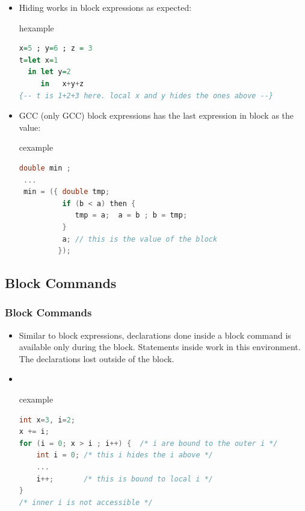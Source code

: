 \begin{frame}[fragile]
\begin{itemize}
 \item Hiding works in block expressions as expected:
\begin{beamercolorbox}{hexample}
\begin{lstlisting}[language={Haskell},escapechar=\#]
x=5 ; y=6 ; z = 3
t=let x=1 
  in let y=2 
     in   x+y+z
{-- t is 1+2+3 here. local x and y hides the ones above --}
\end{lstlisting}
\end{beamercolorbox}
 \item GCC (only GCC) block expressions has the last expression in block as the value:
\begin{beamercolorbox}{cexample}
\begin{lstlisting}[language=C,escapechar=\#]
 double min ;
 ...
 min = ({ double tmp;
          if (b < a) then {
             tmp = a;  a = b ; b = tmp;
          }
          a; // this is the value of the block
         });
\end{lstlisting}\end{beamercolorbox}
\end{itemize}
\end{frame}

\subsection{Block Commands}
\begin{frame}[fragile]
\frametitle{Block Commands}
\begin{itemize}
 \item Similar to block expressions, declarations done inside a block command is available only
 during the block. Statements inside work in this environment. The declarations lost outside of
 the block. 
 \item \ \\
\begin{beamercolorbox}{cexample}
\begin{lstlisting}[language={C},escapechar=\#]
int x=3, i=2;
x += i;
for (i = 0; x > i ; i++) {  /* i are bound to the outer i */
    int i = 0; /* this i hides the i above */
    ...
    i++;       /* this is bound to local i */
}
/* inner i is not accessible */
\end{lstlisting}
\end{beamercolorbox}
\end{itemize}

\end{frame}

